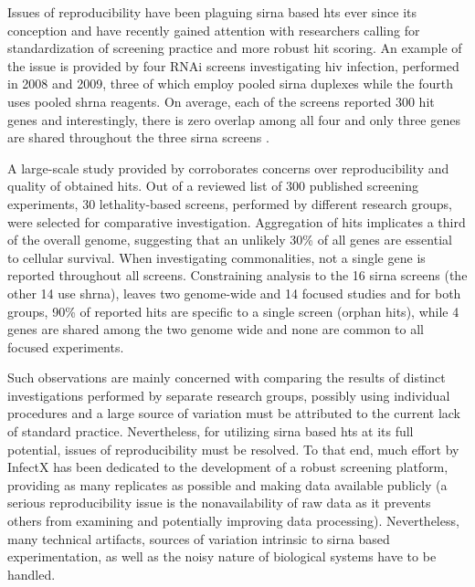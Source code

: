Issues of reproducibility have been plaguing \gls{sirna} based \gls{hts} ever since its conception and have recently gained attention with researchers calling for standardization of screening practice and more robust hit scoring. An example of the issue is provided by four RNAi screens investigating \gls{hiv} infection, performed in 2008 and 2009, three of which employ pooled \gls{sirna} duplexes while the fourth uses pooled \gls{shrna} reagents. On average, each of the screens reported 300 hit genes and interestingly, there is zero overlap among all four and only three genes are shared throughout the three \gls{sirna} screens \citep{Bhinder2014}.

A large-scale study provided by \cite{Bhinder2013} corroborates concerns over reproducibility and quality of obtained hits. Out of a reviewed list of 300 published screening experiments, 30 lethality-based screens, performed by different research groups, were selected for comparative investigation. Aggregation of hits implicates a third of the overall genome, suggesting that an unlikely 30\% of all genes are essential to cellular survival. When investigating commonalities, not a single gene is reported throughout all screens. Constraining analysis to the 16 \gls{sirna} screens (the other 14 use \gls{shrna}), leaves two genome-wide and 14 focused studies and for both groups, 90\% of reported hits are specific to a single screen (orphan hits), while 4 genes are shared among the two genome wide and none are common to all focused experiments.

Such observations are mainly concerned with comparing the results of distinct investigations performed by separate research groups, possibly using individual procedures and a large source of variation must be attributed to the current lack of standard practice. Nevertheless, for utilizing \gls{sirna} based \gls{hts} at its full potential, issues of reproducibility must be resolved. To that end, much effort by InfectX has been dedicated to the development of a robust screening platform, providing as many replicates as possible and making data available publicly (a serious reproducibility issue is the nonavailability of raw data as it prevents others from examining and potentially improving data processing). Nevertheless, many technical artifacts, sources of variation intrinsic to \gls{sirna} based experimentation, as well as the noisy nature of biological systems have to be handled.

